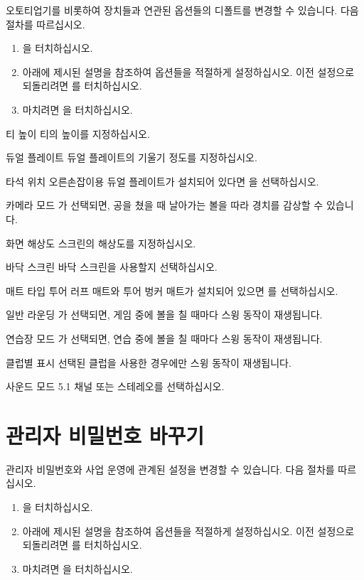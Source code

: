 \documentclass[10pt, openright, language=korean]{hzguide}
\begin{document}
오토티업기를 비롯하여 장치들과 연관된 옵션들의 디폴트를 변경할 수 있습니다. 다음 절차를 따르십시오.

\begin{enumerate}
\item {}을 터치하십시오.
\item 아래에 제시된 설명을 참조하여 옵션들을 적절하게 설정하십시오. 이전 설정으로 되돌리려면 를 터치하십시오.
\item 마치려면 을 터치하십시오. 
\end{enumerate}
    

\begin{UI}
\item[티 높이] 티의 높이를 지정하십시오.
\item[듀얼 플레이트] 듀얼 플레이트의 기울기 정도를 지정하십시오.
\item[타석 위치] 오른손잡이용 듀얼 플레이트가 설치되어 있다면 을 선택하십시오. 
\item[카메라 모드] 가 선택되면, 공을 쳤을 때 날아가는 볼을 따라 경치를 감상할 수 있습니다.
\item[화면 해상도] 스크린의 해상도를 지정하십시오.
\item[바닥 스크린] 바닥 스크린을 사용할지 선택하십시오.
\item[매트 타입] 투어 러프 매트와 투어 벙커 매트가 설치되어 있으면 를 선택하십시오.
\item[일반 라운딩] 가 선택되면, 게임 중에 볼을 칠 때마다 스윙 동작이 재생됩니다.
\item[연습장 모드] 가 선택되면, 연습 중에 볼을 칠 때마다 스윙 동작이 재생됩니다.
\item[클럽별 표시] 선택된 클럽을 사용한 경우에만 스윙 동작이 재생됩니다.
\item[사운드 모드] 5.1 채널 또는 스테레오를 선택하십시오.
\end{UI}

\section{관리자 비밀번호 바꾸기}

관리자 비밀번호와 사업 운영에 관계된 설정을 변경할 수 있습니다. 다음 절차를 따르십시오.

\begin{enumerate}
\item {}을 터치하십시오.
\item 아래에 제시된 설명을 참조하여 옵션들을 적절하게 설정하십시오. 이전 설정으로 되돌리려면 를 터치하십시오.
\item 마치려면 을 터치하십시오. 
\end{enumerate}
\end{document}
